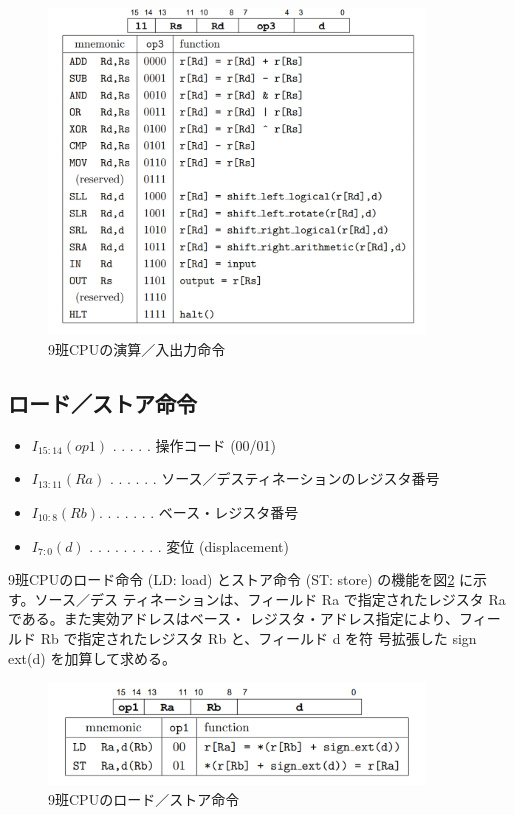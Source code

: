 \documentclass[a4paper,11pt,oneside,openany]{jsarticle}
\begin{document}
\begin{figure}[h]
  \centering
  \includegraphics[width=10cm]{enzan.png}
  \caption{9班CPUの演算／入出力命令}
  \label{enzan}
\end{figure}



\subsection{ロード／ストア命令}
\begin{itemize}
\item $I_{15:14 }(op1)$ . . . . . 操作コード (00/01)
\item $I_{13:11} (Ra)$ . . . . . . ソース／デスティネーションのレジスタ番号
\item $I_{10:8} (Rb) $. . . . . . . ベース・レジスタ番号
\item $I_{7:0} (d)$ . . . . . . . . . 変位 (displacement)
\end{itemize}
9班CPUのロード命令 (LD: load) とストア命令 (ST: store) の機能を図\ref{load} に示す。ソース／デス
ティネーションは、フィールド Ra で指定されたレジスタ Ra である。また実効アドレスはベース・
レジスタ・アドレス指定により、フィールド Rb で指定されたレジスタ Rb と、フィールド d を符
号拡張した sign ext(d) を加算して求める。
\begin{figure}[h]
  \centering
  \includegraphics[width=10cm]{load.png}
  \caption{9班CPUのロード／ストア命令}
  \label{load}
\end{figure}
\end{document}
